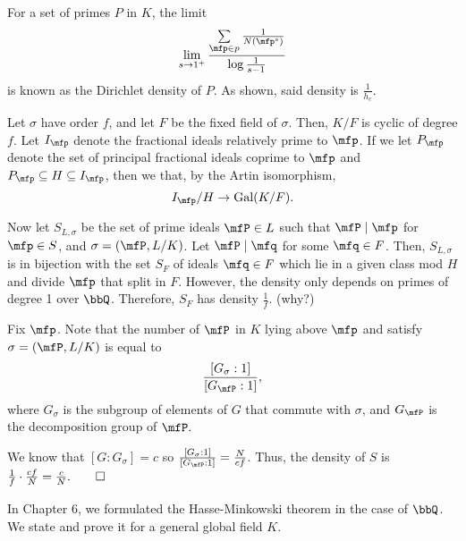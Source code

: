 \documentclass[a4paper, 12pt,oneside,openany]{book}
\begin{document}
For a set of primes $P$ in $K$, the limit $$\lim\limits_{s \to 1^+} \dfrac{\sum\limits_{\mfp \in p} \frac{1}{N(\mfp^s)}}{\log \frac{1}{s-1}}$$ is known as the Dirichlet density of $P$. As shown, said density is $\frac{1}{h_c}$.


 Let $\sigma$ have order $f$, and let $F$ be the fixed field of $\sigma$. Then, $K/F$ is cyclic of degree $f$. Let $I_\mfp$ denote the fractional ideals relatively prime to $\mfp$. If we let $P_\mfp$ denote the set of principal fractional ideals coprime to $\mfp$ and $P_\mfp \subseteq H \subseteq I_\mfp$, then we that, by the Artin isomorphism, $$I_\mfp/H \to \text{Gal}(K/F).$$ 

Now let $S_{L, \sigma}$ be the set of prime ideals $\mfP \in L$ such that $\mfP \mid \mfp$ for $\mfp \in S$, and $\sigma = (\mfP, L/K)$. Let $\mfP \mid \mfq$ for some $\mfq \in F$. Then, $S_{L, \sigma}$ is in bijection with the set $S_F$ of ideals $\mfq \in F$ which lie in a given class mod $H$ and divide $\mfp$ that split in $F$. However, the density only depends on primes of degree 1 over $\bbQ$. Therefore, $S_F$ has density $\frac{1}{f}$. (why?) 

Fix $\mfp$. Note that the number of $\mfP$ in $K$ lying above $\mfp$ and satisfy $\sigma = (\mfP, L/K)$ is equal to $$\frac{[G_\sigma:1]}{[G_\mfP:1]},$$ where $G_\sigma$ is the subgroup of elements of $G$ that commute with $\sigma$, and $G_\mfP$ is the decomposition group of $\mfP.$ 

We know that $[G:G_\sigma] = c$ so $\frac{[G_\sigma:1]}{[G_\mfP:1]} = \frac{N}{cf}$. Thus, the density of $S$ is $\frac{1}{f} \cdot \frac{cf}{N} = \frac{c}{N}. \qed$

In Chapter 6, we formulated the Hasse-Minkowski theorem in the case of $\bbQ$. We state and prove it for a general global field $K$.

\end{document}
